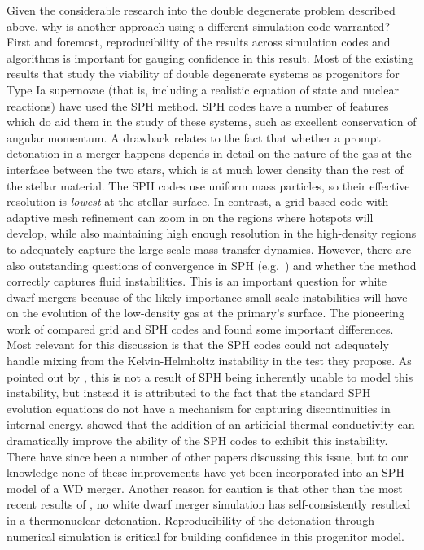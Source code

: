 \documentclass[iop]{../emulateapj}
\begin{document}
Given the considerable research into the double degenerate problem 
described above, why is another approach using a different simulation
code warranted? First and foremost, reproducibility of the results
across simulation codes and algorithms is important for gauging
confidence in this result. Most of the existing results that study 
the viability of double degenerate systems as progenitors for
Type Ia supernovae (that is, including a realistic 
equation of state and nuclear reactions) have
used the SPH method. SPH codes have a number of features which do aid
them in the study of these systems, such as excellent conservation of
angular momentum. A drawback relates to the fact that whether a prompt detonation
in a merger happens depends in detail on the nature of the
gas at the interface between the two stars, which is at much lower
density than the rest of the stellar material. The SPH codes use
uniform mass particles, so their effective resolution is
\textit{lowest} at the stellar surface. In contrast, a grid-based code
with adaptive mesh refinement can zoom in on the regions where
hotspots will develop, while also maintaining high enough resolution
in the high-density regions to adequately capture the large-scale mass
transfer dynamics. However, there are also outstanding questions of
convergence in SPH (e.g.\ \citealt{zhu_SPH:2014}) and whether the method
correctly captures fluid instabilities. This is an important question
for white dwarf mergers because of the likely importance small-scale
instabilities will have on the evolution of the low-density gas at the
primary's surface. The pioneering work of \cite{agertz:2007} compared
grid and SPH codes and found some important differences. Most relevant
for this discussion is that the SPH codes could not adequately handle
mixing from the Kelvin-Helmholtz instability in the test they
propose. As pointed out by \cite{price:2008}, this is not a result of
SPH being inherently unable to model this instability, but instead it
is attributed to the fact that the standard SPH evolution equations do
not have a mechanism for capturing discontinuities in internal
energy. \citeauthor{price:2008} showed that the addition of an
artificial thermal conductivity can dramatically improve the ability
of the SPH codes to exhibit this instability. There have since been a
number of other papers discussing this issue, but to our knowledge
none of these improvements have yet been incorporated into an SPH
model of a WD merger. Another reason for caution is that other than the
most recent results of \cite{kashyap:2015}, no white dwarf merger simulation has self-consistently
resulted in a thermonuclear detonation. Reproducibility of the detonation 
through numerical simulation is critical for building 
confidence in this progenitor model.
\end{document}

